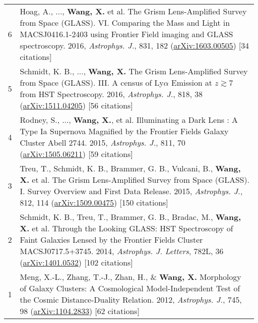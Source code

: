 \documentclass[letterpaper,10pt]{article}
\begin{document}
\begin{longtable}{rp{6.3in}}
6   &   Hoag, A., ..., \textbf{Wang, X.} et al. The Grism Lens-Amplified Survey from Space (GLASS). VI. Comparing the Mass and Light in 
    MACSJ0416.1-2403 using Frontier Field imaging and GLASS spectroscopy. 2016, \textit{Astrophys. J.}, 831, 182 (\href{https://arxiv.org/abs/1603.00505}
    {arXiv:1603.00505}) [34 citations]   \\
5   &   Schmidt, K. B., ..., \textbf{Wang, X.} The Grism Lens-Amplified Survey from Space (GLASS). III. A census of Ly$\alpha$ Emission at $z\gtrsim$7 
    from HST Spectroscopy. 2016, \textit{Astrophys. J.}, 818, 38 (\href{https://arxiv.org/abs/1511.04205}{arXiv:1511.04205}) [56 citations] \\
4   &   Rodney, S., ..., \textbf{Wang, X.}, et al. Illuminating a Dark Lens : A Type Ia Supernova Magnified by the Frontier Fields Galaxy Cluster 
    Abell 2744. 2015, \textit{Astrophys. J.}, 811, 70 (\href{https://arxiv.org/abs/1505.06211}{arXiv:1505.06211}) [59 citations]  \\
3   &   Treu, T., Schmidt, K. B., Brammer, G. B., Vulcani, B., \textbf{Wang, X.} et al. The Grism Lens-Amplified Survey from Space (GLASS). I. Survey 
    Overview and First Data Release. 2015, \textit{Astrophys. J.}, 812, 114 
    (\href{https://arxiv.org/abs/1509.00475}{arXiv:1509.00475}) [150 citations]  \\
2   &   Schmidt, K. B., Treu, T., Brammer, G. B., Bradac, M., \textbf{Wang, X.} et al. Through the Looking GLASS: HST Spectroscopy of Faint Galaxies 
    Lensed by the Frontier Fields Cluster MACSJ0717.5+3745. 2014, \textit{Astrophys. J. Letters}, 782L, 36 (\href{http://arxiv.org/abs/1401.0532}{arXiv:1401.0532}) [102 citations] \\
1   &   Meng, X.-L., Zhang, T.-J., Zhan, H., \& \textbf{Wang, X.} Morphology of Galaxy Clusters: A Cosmological Model-Independent Test of the Cosmic 
    Distance-Duality Relation. 2012, \textit{Astrophys. J.}, 745, 98 (\href{http://arxiv.org/abs/1104.2833}{arXiv:1104.2833}) [62 citations]

\end{longtable}
\endgroup
\end{document}
